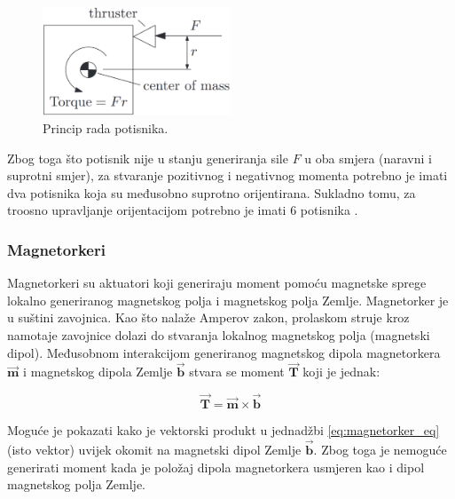 \documentclass[times, utf8, diplomski, numeric]{templates/template}
\begin{document}
{{{{                \begin{figure}[htb]
                \centering
                \includegraphics[width=0.5\textwidth]{images/thruster_img.png}
                \caption{Princip rada potisnika.}
                \label{fig:thruster_img}
                \end{figure}

                Zbog toga što potisnik nije u stanju generiranja sile $F$ u oba smjera (naravni i suprotni smjer), za stvaranje pozitivnog i negativnog momenta potrebno je imati dva potisnika koja su međusobno suprotno orijentirana. Sukladno tomu, za troosno upravljanje orijentacijom potrebno je imati 6 potisnika \cite{adcsKnjiga}.
            }

            \subsubsection{Magnetorkeri }{
                Magnetorkeri su aktuatori koji generiraju moment pomoću magnetske sprege lokalno generiranog magnetskog polja i magnetskog polja Zemlje. Magnetorker je u suštini zavojnica. Kao što nalaže Amperov zakon, prolaskom struje kroz namotaje zavojnice dolazi do stvaranja lokalnog magnetskog polja (magnetski dipol). Međusobnom interakcijom generiranog magnetskog dipola magnetorkera $\overrightarrow{\boldsymbol{m}}$ i magnetskog dipola Zemlje $\overrightarrow{\boldsymbol{b}}$ stvara se moment $\overrightarrow{\boldsymbol{T}}$ koji je jednak:

                \begin{equation}
                    \label{eq:magnetorker_eq}
                    \overrightarrow{\boldsymbol{T}} = \overrightarrow{\boldsymbol{m}} \times \overrightarrow{\boldsymbol{b}}
                \end{equation}

                Moguće je pokazati kako je vektorski produkt u jednadžbi \ref{eq:magnetorker_eq} (isto vektor) uvijek okomit na magnetski dipol Zemlje $\overrightarrow{\boldsymbol{b}}$. Zbog toga je nemoguće generirati moment kada je položaj dipola magnetorkera usmjeren kao i dipol magnetskog polja Zemlje.

}}}}
\end{document}
